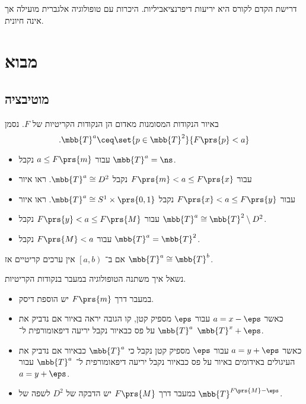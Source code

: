 \documentclass[a4paper,10pt,twoside,openany]{book}
\begin{document}
דרישת הקדם לקורס היא יריעות דיפרנציאביליות. היכרות עם טופולוגיה אלגברית מועילה אך אינה חיונית.

\mainmatter

\chapter{מבוא}
\section{מוטיבציה}

\begin{example}
באיור
הנקודות המסומנות מאדום הן הנקודות הקריטיות של
$F$.
נסמן
\[\text{.} \mbb{T}^a \ceq \set{p \in \mbb{T}^2}{F\prs{p} < a}\]
\begin{itemize}
\item עבור
$a \leq F\prs{m}$
נקבל
$\mbb{T}^a = \ns$.
\item עבור
$F\prs{m} < a \leq F\prs{x}$
נקבל
$\mbb{T}^a \cong D^2$.
ראו איור
\item עבור
$F\prs{x} < a \leq F\prs{y}$
נקבל
$\mbb{T}^a \cong S^1 \times \prs{0,1}$.
ראו איור
\item
עבור
$F\prs{y} < a \leq F\prs{M}$
נקבל
$\mbb{T}^a \cong \mbb{T}^2 \setminus D^2$.
\item עבור
$F\prs{M} < a$
נקבל
$\mbb{T}^a = \mbb{T}^2$.
\end{itemize}

\begin{corollary}
אם ב־%
$\left[ a, b \right)$
אין ערכים קריטיים אז
$\mbb{T}^a \cong \mbb{T}^b$.
\end{corollary}

נשאל איך משתנה הטופולוגיה במעבר בנקודות הקריטיות.
\begin{itemize}
\item במעבר דרך
$F\prs{m}$
יש הוספת דיסק.
\item כאשר
$a = x-\eps$
עבור
$\eps$
מספיק קטן, קו הגובה יראה באיור
אם נדביק את
$\mbb{T}^a$
על פס כבאיור
נקבל יריעה דיפאומורפית ל־%
$\mbb{T}^x+\eps$.

\item כאשר
$a = y+\eps$
עבור
$\eps$
מספיק קטן נקבל כי
$\mbb{T}^a$
כבאיור
אם נדביק את העיגולים באידומים באיור על פס כבאיור
נקבל יריעה דיפאומורפית ל־%
$\mbb{T}^a$
עבור
$a = y + \eps$.

\item במעבר דרך
$F\prs{M}$
יש הדבקה של
$D^2$
לשפה של
$\mbb{T}^{F\prs{M} - \eps}$.
\end{itemize}

\end{example}
\end{document}
